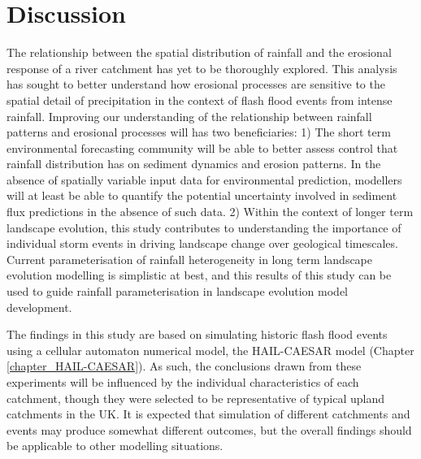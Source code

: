 \section{Discussion}

The relationship between the spatial distribution of rainfall and the erosional response of a river catchment has yet to be thoroughly explored. This analysis has sought to better understand how erosional processes are sensitive to the spatial detail of precipitation in the context of flash flood events from intense rainfall. Improving our understanding of the relationship between rainfall patterns and erosional processes will has two beneficiaries: 1) The short term environmental forecasting community will be able to better assess control that  rainfall distribution has on sediment dynamics and erosion patterns. In the absence of spatially variable input data for environmental prediction, modellers will at least be able to quantify the potential uncertainty involved in sediment flux predictions in the absence of such data. 2) Within the context of longer term landscape evolution, this study contributes to understanding the importance of individual storm events in driving landscape change over geological timescales. Current parameterisation of rainfall heterogeneity in long term landscape evolution modelling is simplistic at best, and this results of this study can be used to guide rainfall parameterisation in landscape evolution model development. 

The findings in this study are based on simulating historic flash flood events using a cellular automaton  numerical model, the HAIL-CAESAR model (Chapter \ref{chapter_HAIL-CAESAR}). As such, the conclusions drawn from these experiments will be influenced by the individual characteristics of each catchment, though they were selected to be representative of typical upland catchments in the UK. It is expected that simulation of different catchments and events may produce somewhat different outcomes, but the overall findings should be applicable to other modelling situations. 


